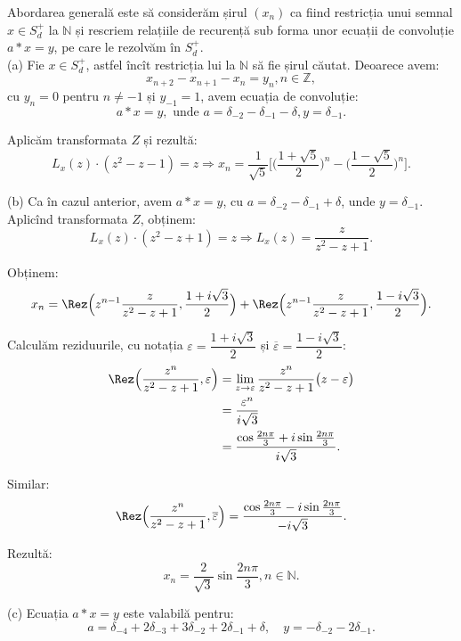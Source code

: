 Abordarea generală este să considerăm șirul $(x_n)$ ca fiind restricția unui 
semnal $x \in S_d^+$ la $\mathbb{N}$ și rescriem relațiile de recurență sub 
forma unor ecuații de convoluție $a \ast x = y$, pe care le rezolvăm în $S_d^+$.\\

(a) Fie $x \in S_d^+$, astfel încît restricția lui la $\mathbb{N}$ să fie șirul 
căutat. Deoarece avem: 
\[
    x_{n+2} - x_{n+1} - x_n = y_n, n \in \mathbb{Z},
\]
cu $y_n = 0$ pentru $n \neq -1$ și $y_{-1} = 1$, avem ecuația de convoluție: 
\[
    a \ast x = y, \text{ unde } a 
    = \delta_{-2} - \delta_{-1} - \delta, y = \delta_{-1}.
\]

Aplicăm transformata $Z$ și rezultă: 
\[
    L_x(z) \cdot (z^2 - z - 1) = z \Longrightarrow x_n 
    = \dfrac{1}{\sqrt{5}} \Big[ \Big( \dfrac{1 + \sqrt{5}}{2} \Big)^n - 
    \Big( \dfrac{1 - \sqrt{5}}{2} \Big)^n \Big].
\]

(b) Ca în cazul anterior, avem $a \ast x = y$, cu 
$a = \delta_{-2} - \delta_{-1} + \delta$, unde $y = \delta_{-1}$. Aplicînd 
transformata $Z$, obținem: 
\[
    L_x(z) \cdot (z^2 - z + 1) = z \Longrightarrow L_x(z) 
    = \dfrac{z}{z^2 - z + 1}.
\]

Obținem:
\[
    x_n = \Rez \Big( z^{n-1} \dfrac{z}{z^2 - z + 1}, 
    \dfrac{1 + i \sqrt{3}}{2} \Big) + \Rez \Big( z^{n-1} \dfrac{z}{z^2 - z + 1}, 
    \dfrac{1 - i \sqrt{3}}{2} \Big).
\]

Calculăm reziduurile, cu notația $\varepsilon = \dfrac{1 + i \sqrt{3}}{2}$ și 
$\overline{\varepsilon} = \dfrac{1 - i \sqrt{3}}{2}$:
\begin{align*}
    \Rez \Big( \dfrac{z^n}{z^2 - z + 1}, \varepsilon \Big) 
   &= \lim_{z \to \varepsilon} \dfrac{z^n}{z^2 - z + 1} 
   \big( z - \varepsilon \big) \\
   &= \dfrac{\varepsilon^n}{i \sqrt{3}} \\
   &= \dfrac{\cos \frac{2 n \pi}{3} + i \sin \frac{2 n \pi}{3}}{i \sqrt{3}}.
\end{align*}

Similar: 
\[
    \Rez \Big( \dfrac{z^n}{z^2 - z + 1}, \overline{\varepsilon} \Big) 
    = \dfrac{\cos \frac{2n\pi}{3} - i \sin \frac{2 n \pi}{3}}{-i\sqrt{3}}.
\]

Rezultă: 
\[
    x_n = \dfrac{2}{\sqrt{3}} \sin \dfrac{2n\pi}{3}, n \in \mathbb{N}.
\]

(c) Ecuația $a \ast x = y$ este valabilă pentru: 
\[
    a = \delta_{-4} + 2 \delta_{-3} + 3 \delta_{-2} + 2 \delta_{-1} + \delta, 
    \quad y = -\delta_{-2} - 2 \delta_{-1}.
\]

